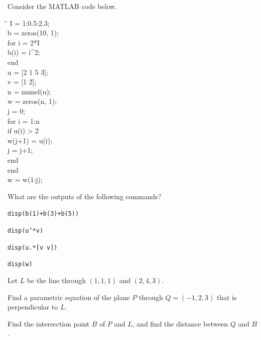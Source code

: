 \documentclass[11pt,oneside]{article}
\begin{document}
\begin{problem}
Consider the MATLAB code below.

{\small\ttfamily
\begin{tabbing}
\hspace{2em}\=\hspace{2em}\=\kill
I = 1:0.5:2.3;\\
b = zeros(10, 1);\\
for i = 2*I\\
\>b(i) = i\textasciicircum 2;\\
end\\[0.15em]
u = [2 1 5 3];\\
v = [1 2];\\[0.15em]
n = numel(u);\\
w = zeros(n, 1);\\
j = 0;\\
for i = 1:n\\
\>if u(i) > 2\\
\>\>w(j+1) = u(i);\\
\>\>j = j+1;\\
\>end\\
end\\
w = w(1:j);
\end{tabbing}
}

What are the outputs of the following commands?
\begin{problemsubparts}
\item \texttt{disp(b(1)+b(3)+b(5))}
\item \texttt{disp(u'*v)}
\item \texttt{disp(u.*[v v])}
\item \texttt{disp(w)}
\end{problemsubparts}
\end{problem}

\begin{problem}
Let $L$ be the line through $(1,1,1)$ and $(2,4,3)$.
\begin{problemsubparts}
\item Find a parametric equation of the plane $P$ through $Q=(-1,2,3)$ that is perpendicular to $L$.
\item Find the intersection point $B$ of $P$ and $L$, and find the distance between $Q$ and $B$.
\end{problemsubparts}
\end{problem}
\end{document}

